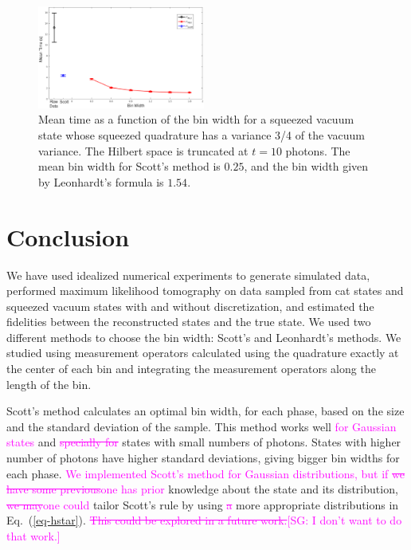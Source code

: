 \documentclass[
reprint,
superscriptaddress,
showpacs,
amsmath,
amssymb,
aps,
pra,
longbibliography
]{revtex4-1}
\providecommand{\aucmnt}[1]{#1}
\providecommand{\editcolor}[2]{\textcolor{#1}{#2}}
\providecommand{\aucmnt}[1]{}
\providecommand{\editcolor}[2]{#2}
\newcommand{\SG}[1]{\editcolor{magenta}{#1}}
\newcommand{\SGs}[1]{\aucmnt{\editcolor{magenta}{\sout{#1}}}}
\newcommand{\SGc}[1]{\aucmnt{\editcolor{magenta}{[SG: #1]}}}
\begin{document}
\begin{figure}
  \includegraphics[width=0.49\textwidth]{time-vacuocomprimido.eps}
  \caption{Mean time as a function of the bin width for a squeezed
    vacuum state whose squeezed quadrature has a variance 3/4 of the
    vacuum variance. The Hilbert space is truncated at $t=10$ photons. The
    mean bin width for Scott's method is $0.25$, and the bin width
    given by Leonhardt's formula is $1.54$.}
  \label{fig-time-squeezed}
\end{figure}



\section{Conclusion}
\label{conclusion}

We have used idealized numerical experiments to generate simulated
data, performed maximum likelihood tomography on data sampled
from cat states and squeezed vacuum states with and without
discretization, and estimated the fidelities between
the reconstructed states and the true state. We used two different
methods to choose the bin width: Scott's and Leonhardt's methods. We
studied using measurement operators calculated using the
quadrature exactly at the center of each bin and integrating the
measurement operators along the length of the bin. 

Scott's method calculates an optimal bin width, for each phase, based
on the size and the standard deviation of the sample. This method
works well \SG{for Gaussian states} and \SGs{specially for} states
with small numbers of photons.  States with higher number of photons
have higher standard deviations, giving bigger bin widths for each
phase. \SG{We implemented Scott's method for Gaussian distributions,
  but if} \SGs{we have some previous}\SG{one has prior} knowledge
about the state and its distribution, \SGs{we may}\SG{one could}
tailor Scott's rule by using \SGs{a} more appropriate distributions in
Eq.~(\ref{eq-hstar}).  \SGs{This could be explored in a future
  work.}\SGc{I don't want to do that work.}
\end{document}
